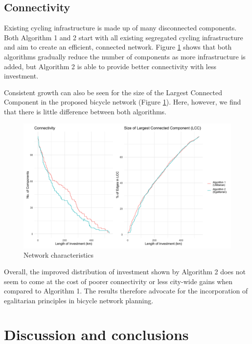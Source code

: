 \documentclass[
]{article}
\begin{document}
\hypertarget{connectivity}{%
\subsection{Connectivity}\label{connectivity}}

Existing cycling infrastructure is made up of many disconnected
components. Both Algorithm 1 and 2 start with all existing segregated
cycling infrastructure and aim to create an efficient, connected
network. Figure \ref{fig:componentsandGCC} shows that both algorithms
gradually reduce the number of components as more infrastructure is
added, but Algorithm 2 is able to provide better connectivity with less
investment.

Consistent growth can also be seen for the size of the Largest Connected
Component in the proposed bicycle network (Figure
\ref{fig:componentsandGCC}). Here, however, we find that there is little
difference between both algorithms.

\begin{figure}[H]

{\centering \includegraphics[width=0.85\linewidth]{data/Manchester/Plots/Growth_Results/growth_util_egal_components_gcc_components_together_Manchester} 

}

\caption{Network characteristics}\label{fig:componentsandGCC}
\end{figure}

Overall, the improved distribution of investment shown by Algorithm 2 does not seem to come at the cost
of poorer connectivity or less city-wide gains when compared to Algorithm 1.
The results therefore advocate for the incorporation of egalitarian principles in bicycle network planning.

\hypertarget{discussion-and-conclusions}{%
\section{Discussion and conclusions}\label{discussion-and-conclusions}}
\end{document}
